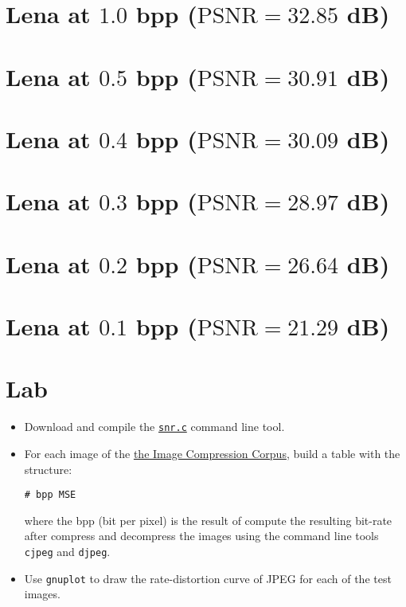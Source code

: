 \section*{Lena at $1.0$ bpp ($\text{PSNR}=32.85$ dB)}
\begin{center}
\end{center}

\section*{Lena at $0.5$ bpp ($\text{PSNR}=30.91$ dB)}
\begin{center}
\end{center}

\section*{Lena at $0.4$ bpp ($\text{PSNR}=30.09$ dB)}
\begin{center}
\end{center}

\section*{Lena at $0.3$ bpp ($\text{PSNR}=28.97$ dB)}
\begin{center}
\end{center}

\section*{Lena at $0.2$ bpp ($\text{PSNR}=26.64$ dB)}
\begin{center}
\end{center}

\section*{Lena at $0.1$ bpp ($\text{PSNR}=21.29$ dB)}
\begin{center}
\end{center}

\section{Lab}
\begin{itemize}
\item Download and compile the
  \href{http://www.ace.ual.es/~vruiz/docencia/doctorado/snr.c}{\texttt{snr.c}}
  command line tool.
\item For each image of the
  \href{http://www.ace.ual.es/~vruiz/images/}{the Image Compression
    Corpus}, build a table with the structure:
\begin{verbatim}
# bpp MSE
\end{verbatim}
where the bpp (bit per pixel) is the result of compute the resulting
bit-rate after compress and decompress the images using the command
line tools \texttt{cjpeg} and \texttt{djpeg}.
\item Use \texttt{gnuplot} to draw the rate-distortion curve of JPEG
  for each of the test images.
\end{itemize}



